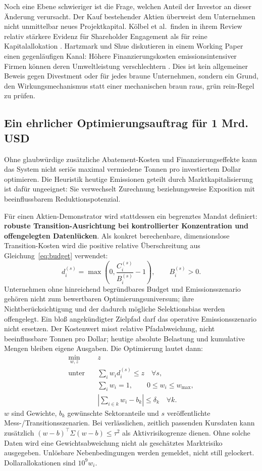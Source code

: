 \documentclass[11pt,a4paper]{article}
\begin{document}
Noch eine Ebene schwieriger ist die Frage, welchen Anteil der Investor an dieser Änderung verursacht. Der Kauf bestehender Aktien überweist dem Unternehmen nicht unmittelbar neues Projektkapital. Kölbel et al.\ finden in ihrem Review relativ stärkere Evidenz für Shareholder Engagement als für reine Kapitalallokation \cite{koelbel2020}. Hartzmark und Shue diskutieren in einem Working Paper einen gegenläufigen Kanal: Höhere Finanzierungskosten emissionsintensiver Firmen können deren Umweltleistung verschlechtern \cite{hartzmark2026}. Dies ist kein allgemeiner Beweis gegen Divestment oder für jedes braune Unternehmen, sondern ein Grund, den Wirkungsmechanismus statt einer mechanischen \glqq braun raus, grün rein\grqq{}-Regel zu prüfen.

\subsection{Ein ehrlicher Optimierungsauftrag für 1 Mrd. USD}
Ohne glaubwürdige zusätzliche Abatement-Kosten und Finanzierungseffekte kann das System nicht seriös \glqq maximal vermiedene Tonnen pro investiertem Dollar\grqq{} optimieren. Die Heuristik \glqq heutige Emissionen geteilt durch Marktkapitalisierung\grqq{} ist dafür ungeeignet: Sie verwechselt Zurechnung beziehungsweise Exposition mit beeinflussbarem Reduktionspotenzial.

Für einen Aktien-Demonstrator wird stattdessen ein begrenztes Mandat definiert: \textbf{robuste Transition-Ausrichtung bei kontrollierter Konzentration und offengelegten Datenlücken}. Als konkret berechenbare, dimensionslose Transition-Kosten wird die positive relative Überschreitung aus Gleichung~\ref{eq:budget} verwendet:
\begin{equation}
d_i^{(s)}=\max\!\left(0,\frac{C_i^{(s)}}{B_i^{(s)}}-1\right),\qquad B_i^{(s)}>0.
\end{equation}
Unternehmen ohne hinreichend begründbares Budget und Emissionsszenario gehören nicht zum bewertbaren Optimierungsuniversum; ihre Nichtberücksichtigung und der dadurch mögliche Selektionsbias werden offengelegt. Ein bloß angekündigter Zielpfad darf das operative Emissionsszenario nicht ersetzen. Der Kostenwert misst relative Pfadabweichung, nicht beeinflussbare Tonnen pro Dollar; heutige absolute Belastung und kumulative Mengen bleiben eigene Ausgaben. Die Optimierung lautet dann:
\begin{align}
\min_{w,z}\quad &z\\
\text{unter}\quad &\sum_i w_i d_i^{(s)}\leq z\quad\forall s,\\
&\sum_i w_i=1,\qquad 0\leq w_i\leq w_{\max},\\
&\left|\sum_{i\in k}w_i-b_k\right|\leq\delta_k\quad\forall k.
\end{align}
$w$ sind Gewichte, $b_k$ gewünschte Sektoranteile und $s$ veröffentlichte Mess-/Transitionsszenarien. Bei verlässlichen, zeitlich passenden Kursdaten kann zusätzlich $(w-b)^\top\Sigma(w-b)\leq\tau^2$ als Aktivrisikogrenze dienen. Ohne solche Daten wird eine Gewichtsabweichung nicht als geschätztes Marktrisiko ausgegeben. Unlösbare Nebenbedingungen werden gemeldet, nicht still gelockert. Dollarallokationen sind $10^9w_i$.
\end{document}
